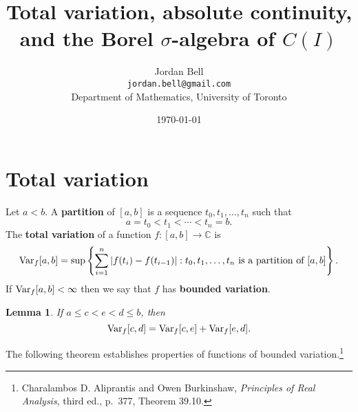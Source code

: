 \documentclass{article}
\newcommand{\Var}{\ensuremath\mathrm{Var}}
\newtheorem{lemma}[theorem]{Lemma}
\theoremstyle{definition}
\begin{document}
\title{Total variation, absolute continuity, and the Borel $\sigma$-algebra of $C(I)$}
\author{Jordan Bell\\ \texttt{jordan.bell@gmail.com}\\Department of Mathematics, University of Toronto}
\date{\today}

\maketitle

\section{Total variation}
Let $a < b$.
A \textbf{partition} of $[a,b]$ is a sequence $t_0,t_1,\ldots,t_n$ such that
\[
a=t_0 <  t_1 < \cdots < t_n = b.
\]
The \textbf{total variation} of a function $f:[a,b] \to \mathbb{C}$ is
\[
\Var_f[a,b] = \sup\left\{ \sum_{i=1}^n |f(t_i)-f(t_{i-1})|: \textrm{$t_0,t_1,\ldots,t_n$ is a partition of $[a,b]$}\right\}.
\]
If $\Var_f[a,b]<\infty$ then we say that $f$ has \textbf{bounded variation}.


\begin{lemma}
If $a \leq c < e < d \leq b$, then
\[
\Var_f[c,d] = \Var_f[c,e]+\Var_f[e,d].
\]
\end{lemma}

The following theorem establishes properties of functions of bounded variation.\footnote{Charalambos D. Aliprantis and Owen Burkinshaw, {\em Principles of Real Analysis}, third ed.,
p.~377, Theorem 39.10.}
\end{document}
